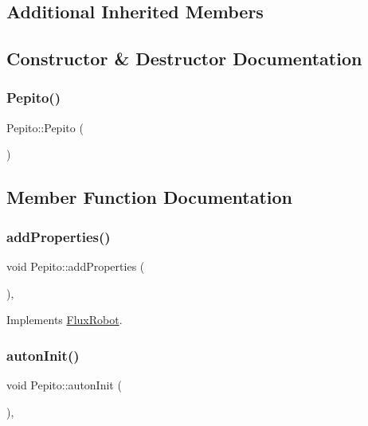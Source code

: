 \subsection*{Additional Inherited Members}


\subsection{Constructor \& Destructor Documentation}
\mbox{\label{classPepito_a5cfed0e7fc2f459c9dd983e44f46ae53}} 
\subsubsection{\texorpdfstring{Pepito()}{Pepito()}}
{\footnotesize\ttfamily Pepito\+::\+Pepito (\begin{DoxyParamCaption}{ }\end{DoxyParamCaption})}



\subsection{Member Function Documentation}
\mbox{\label{classPepito_a1368f048f197d9b0e3a7e710dd4809fc}} 
\subsubsection{\texorpdfstring{add\+Properties()}{addProperties()}}
{\footnotesize\ttfamily void Pepito\+::add\+Properties (\begin{DoxyParamCaption}{ }\end{DoxyParamCaption})\hspace{0.3cm}{\ttfamily [override]}, {\ttfamily [virtual]}}



Implements \hyperlink{classFluxRobot_a6f7940d8f82e80a6e405bad20ec9a5a5}{Flux\+Robot}.

\mbox{\label{classPepito_ac9a8b75ef48cd95683733af317618ca4}} 
\subsubsection{\texorpdfstring{auton\+Init()}{autonInit()}}
{\footnotesize\ttfamily void Pepito\+::auton\+Init (\begin{DoxyParamCaption}{ }\end{DoxyParamCaption})\hspace{0.3cm}{\ttfamily [override]}, {\ttfamily [virtual]}}



